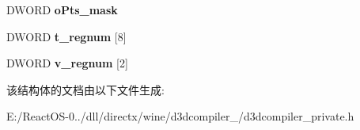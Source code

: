 \begin{DoxyCompactItemize}
\item 
\mbox{\label{structbc__writer_a94afed7601e199e2b5bc146dfb8f867d}} 
D\+W\+O\+RD {\bfseries o\+Pts\+\_\+mask}
\item 
\mbox{\label{structbc__writer_aca1e860b4b0870057e79967aed13d17e}} 
D\+W\+O\+RD {\bfseries t\+\_\+regnum} \mbox{[}8\mbox{]}
\item 
\mbox{\label{structbc__writer_a6fdac71b3c6ee757af961c1c6c69a345}} 
D\+W\+O\+RD {\bfseries v\+\_\+regnum} \mbox{[}2\mbox{]}
\end{DoxyCompactItemize}


该结构体的文档由以下文件生成\+:\begin{DoxyCompactItemize}
\item 
E\+:/\+React\+O\+S-\/0../dll/directx/wine/d3dcompiler\+\_/d3dcompiler\+\_\+private.\+h\end{DoxyCompactItemize}

